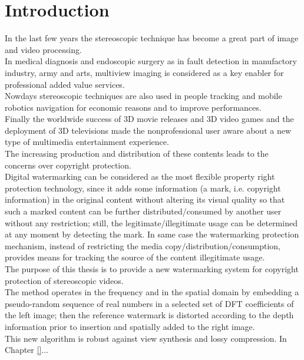 \chapter*{Introduction}
\label{intro}
{}

In the last few years the stereoscopic technique has become a great part of image and video processing.\\
In medical diagnosis and endoscopic surgery as in fault detection in manufactory industry, army and arts,
multiview imaging is considered as a key enabler  for professional added value services.\\
Nowdays stereoscopic techniques are also used in people tracking and mobile robotics
navigation for economic reasons and to improve performances.\\
Finally the worldwide success of 3D movie releases and 3D video games and the deployment of 3D televisions made the nonprofessional user aware about a new type of multimedia entertainment experience.\\
The increasing production and distribution of these contents leads to the concerns over copyright protection.\\
Digital watermarking can be considered as the most flexible property right protection technology, since it adds some information (a mark, i.e. copyright information) in the
original content without altering its visual quality so that such a marked content can be further distributed/consumed by another user without any restriction; still, the legitimate/illegitimate usage can be determined at any moment by detecting the mark. In same case the watermarking protection mechanism, instead of restricting the media copy/distribution/consumption, provides means for tracking the source of the content illegitimate usage.\\
The purpose of this thesis is to provide a new watermarking system for copyright protection of stereoscopic videos.\\
The method operates in the frequency and in the spatial domain by embedding a pseudo-random sequence of real numbers in a selected set of DFT coefficients of the left image; then the reference watermark is distorted according to the depth information prior to insertion and spatially added to the right image.\\
This new algorithm is robust against view synthesis and lossy compression.
In Chapter \ref{}...